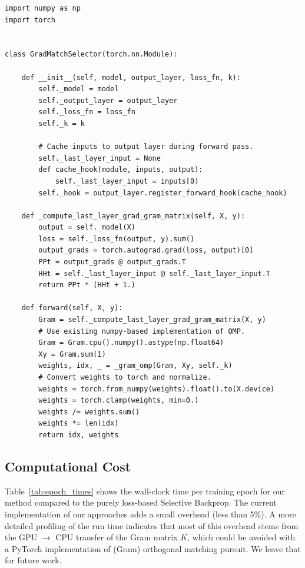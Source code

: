 \documentclass{article}
\theoremstyle{plain}
\theoremstyle{definition}
\theoremstyle{remark}
\begin{document}
\begin{lstlisting}
import numpy as np
import torch


class GradMatchSelector(torch.nn.Module):

    def __init__(self, model, output_layer, loss_fn, k):
        self._model = model
        self._output_layer = output_layer
        self._loss_fn = loss_fn
        self._k = k
        
        # Cache inputs to output layer during forward pass.
        self._last_layer_input = None
        def cache_hook(module, inputs, output):
            self._last_layer_input = inputs[0]
        self._hook = output_layer.register_forward_hook(cache_hook)

    def _compute_last_layer_grad_gram_matrix(self, X, y):
        output = self._model(X)
        loss = self._loss_fn(output, y).sum()
        output_grads = torch.autograd.grad(loss, output)[0]
        PPt = output_grads @ output_grads.T
        HHt = self._last_layer_input @ self._last_layer_input.T
        return PPt * (HHt + 1.)
    
    def forward(self, X, y):
        Gram = self._compute_last_layer_grad_gram_matrix(X, y)
        # Use existing numpy-based implementation of OMP.
        Gram = Gram.cpu().numpy().astype(np.float64)
        Xy = Gram.sum(1)
        weights, idx, _ = _gram_omp(Gram, Xy, self._k)
        # Convert weights to torch and normalize.
        weights = torch.from_numpy(weights).float().to(X.device)
        weights = torch.clamp(weights, min=0.)
        weights /= weights.sum()
        weights *= len(idx)
        return idx, weights
\end{lstlisting}


\subsection{Computational Cost}

Table~\ref{tab:epoch_times} shows the wall-clock time per training epoch for our method compared to the purely loss-based Selective Backprop.
The current implementation of our approaches adds a small overhead (less than 5\%).
A more detailed profiling of the run time indicates that most of this overhead stems from the GPU $\to$ CPU transfer of the Gram matrix $K$, which could be avoided with a PyTorch implementation of (Gram) orthogonal matching pursuit.
We leave that for future work.

\begin{table}[H]
    \caption{Wall-clock time [s] per epoch for vanilla selective backprop (SB) and gradient matching (GM).}
    \centering
    \footnotesize
    
    \label{tab:epoch_times}
\end{table}
\end{document}
